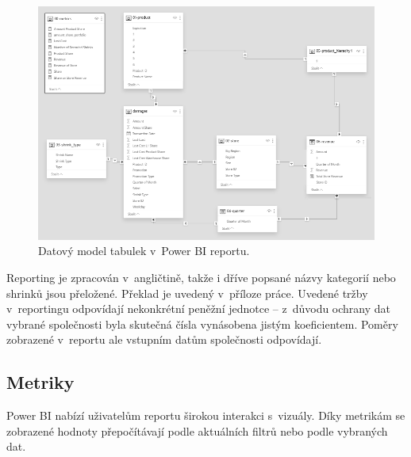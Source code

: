 \begin{figure}[hbtp!]
    \centering
    \captionsetup{justification=centering}
    \includegraphics[width=\textwidth]{obrazky/PBI/datmodel.png}
    \caption{Datový model tabulek v~Power BI reportu.}
    \label{obr:datmod}
\end{figure}

Reporting je zpracován v~angličtině, takže i dříve popsané názvy kategorií nebo shrinků jsou přeložené. Překlad je uvedený v~příloze práce. Uvedené tržby v~reportingu odpovídají nekonkrétní peněžní jednotce -- z~důvodu ochrany dat vybrané společnosti byla skutečná čísla vynásobena jistým koeficientem. Poměry zobrazené v~reportu ale vstupním datům společnosti odpovídají.

\subsection{Metriky}

Power BI nabízí uživatelům reportu širokou interakci s~vizuály. Díky metrikám se zobrazené hodnoty přepočítávají podle aktuálních filtrů nebo podle vybraných dat. 

